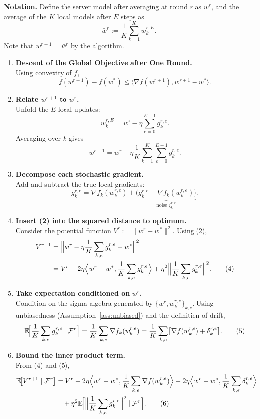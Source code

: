 \documentclass{article}
\newcommand{\E}{\mathbb{E}}
\begin{document}
\textbf{Notation.}
Define the server model after averaging at round $r$ as $w^{r}$,
and the average of the $K$ local models after $E$ steps as
\[
\bar w^{r}:=\frac1K\sum_{k=1}^{K} w_{k}^{r,E}.
\]
Note that $w^{r+1}= \bar w^{r}$ by the algorithm.

\begin{enumerate}
\item \textbf{Descent of the Global Objective after One Round.}\\
Using convexity of $f$,
\[
f(w^{r+1})-f(w^{*})\le\langle\nabla f(w^{r+1}),w^{r+1}-w^{*}\rangle.
\tag{1}
\]

\item \textbf{Relate $w^{r+1}$ to $w^{r}$.}\\
Unfold the $E$ local updates:
\[
w_{k}^{r,E}=w^{r}-\eta\sum_{e=0}^{E-1}g_{k}^{r,e}.
\]
Averaging over $k$ gives
\[
w^{r+1}=w^{r}-\eta\frac1K\sum_{k=1}^{K}\sum_{e=0}^{E-1}g_{k}^{r,e}.
\tag{2}
\]

\item \textbf{Decompose each stochastic gradient.}\\
Add and subtract the true local gradients:
\[
g_{k}^{r,e}= \nabla f_k(w_{k}^{r,e}) + \underbrace{\bigl(g_{k}^{r,e}-\nabla f_k(w_{k}^{r,e})\bigr)}_{\text{noise } \zeta_{k}^{r,e}}.
\tag{3}
\]

\item \textbf{Insert (2) into the squared distance to optimum.}\\
Consider the potential function $V^{r}:=\|w^{r}-w^{*}\|^{2}$.
Using (2),
\[
\begin{aligned}
V^{r+1}
&=\Bigl\|w^{r}-\eta\frac1K\sum_{k,e}g_{k}^{r,e}-w^{*}\Bigr\|^{2}\\
&=V^{r}
-2\eta\Bigl\langle w^{r}-w^{*},\frac1K\sum_{k,e}g_{k}^{r,e}\Bigr\rangle
+\eta^{2}\Bigl\|\frac1K\sum_{k,e}g_{k}^{r,e}\Bigr\|^{2}.
\tag{4}
\end{aligned}
\]

\item \textbf{Take expectation conditioned on $w^{r}$.}\\
Condition on the sigma‑algebra generated by $\{w^{r}, w_{k}^{r,e}\}_{k,e}$.
Using unbiasedness (Assumption~\ref{ass:unbiased}) and the definition of drift,
\[
\E\!\Bigl[\frac1K\sum_{k,e}g_{k}^{r,e}\mid\mathcal{F}^{r}\Bigr]
= \frac1K\sum_{k,e}\nabla f_k(w_{k}^{r,e})
= \frac1K\sum_{k,e}\bigl[\nabla f(w_{k}^{r,e})+\delta_{k}^{r,e}\bigr].
\tag{5}
\]

\item \textbf{Bound the inner product term.}\\
From (4) and (5),
\[
\begin{aligned}
\E\!\bigl[V^{r+1}\mid\mathcal{F}^{r}\bigr]
&=V^{r}
-2\eta\Bigl\langle w^{r}-w^{*},\frac1K\sum_{k,e}\nabla f(w_{k}^{r,e})\Bigr\rangle
-2\eta\Bigl\langle w^{r}-w^{*},\frac1K\sum_{k,e}\delta_{k}^{r,e}\Bigr\rangle\\
&\quad+\eta^{2}\E\!\Bigl[\Bigl\|\frac1K\sum_{k,e}g_{k}^{r,e}\Bigr\|^{2}\mid\mathcal{F}^{r}\Bigr].
\tag{6}
\end{aligned}
\]


\end{enumerate}
\end{document}
